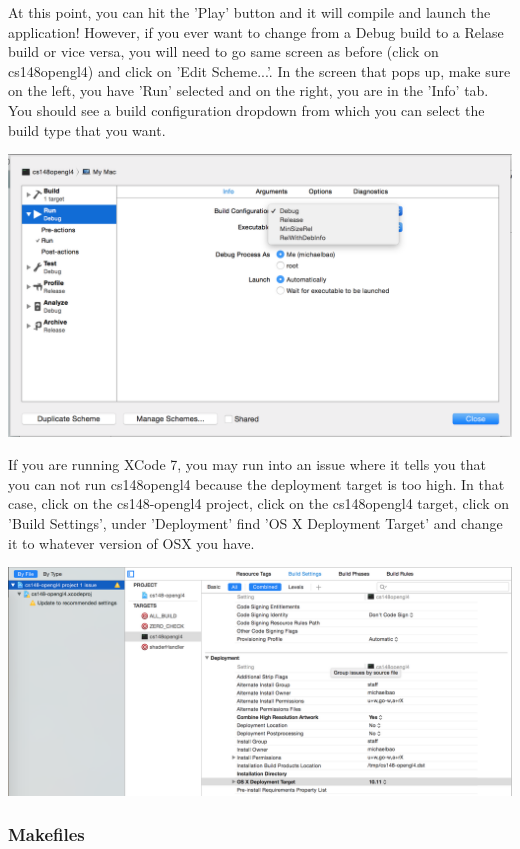 \documentclass{article}
\begin{document}
At this point, you can hit the 'Play' button and it will compile and launch the application! However, if you ever want to change from a Debug build to a Relase build or vice versa, you will need to go same screen as before (click on cs148opengl4) and click on 'Edit Scheme...'. In the screen that pops up, make sure on the left, you have 'Run' selected and on the right, you are in the 'Info' tab. You should see a build configuration dropdown from which you can select the build type that you want.

\includegraphics[width=\linewidth]{xcode2.png}

If you are running XCode 7, you may run into an issue where it tells you that you can not run cs148opengl4 because the deployment target is too high. In that case, click on the cs148-opengl4 project, click on the cs148opengl4 target, click on 'Build Settings', under 'Deployment' find 'OS X Deployment Target' and change it to whatever version of OSX you have.

\includegraphics[width=\linewidth]{xcode3.png}

\subsubsection*{Makefiles}
\end{document}
